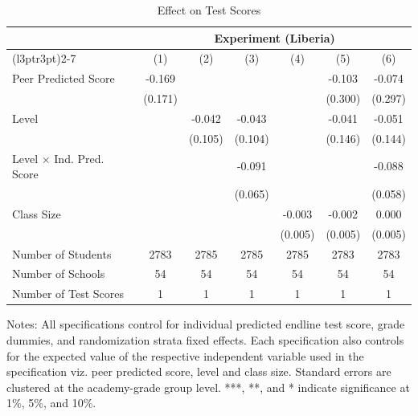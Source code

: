 \begin{table}[!h]
\centering\centering\centering
\caption{Effect on Test Scores}
\centering
\begin{threeparttable}
\fontsize{10}{12}\selectfont
\begin{tabular}[t]{lcccccc}
\toprule
\multicolumn{1}{c}{ } & \multicolumn{6}{c}{Experiment (Liberia)} \\
\cmidrule(l{3pt}r{3pt}){2-7}
  & (1) & (2) & (3) & (4) & (5) & (6)\\
\midrule
Peer Predicted Score & -0.169 &  &  &  & -0.103 & -0.074\\
 & (0.171) &  &  &  & (0.300) & (0.297)\\
Level &  & -0.042 & -0.043 &  & -0.041 & -0.051\\
 &  & (0.105) & (0.104) &  & (0.146) & (0.144)\\
Level $\times$ Ind. Pred. Score &  &  & -0.091 &  &  & -0.088\\
 &  &  & (0.065) &  &  & (0.058)\\
Class Size &  &  &  & -0.003 & -0.002 & 0.000\\
 &  &  &  & (0.005) & (0.005) & (0.005)\\
\hline
\midrule
Number of Students & 2783 & 2785 & 2785 & 2785 & 2783 & 2783\\
Number of Schools & 54 & 54 & 54 & 54 & 54 & 54\\
Number of Test Scores & 1 & 1 & 1 & 1 & 1 & 1\\
\bottomrule
\end{tabular}
\begin{tablenotes}[para]
\item Notes: All specifications control for individual predicted endline test score, 
           grade dummies, and randomization strata fixed effects. Each specification also controls for the    
           expected value of the respective independent variable used in the specification viz. peer predicted              score, level and class size. Standard errors are clustered at the academy-grade group level. ***, **,            and * indicate significance at 1\%, 5\%, and 10\%.
\end{tablenotes}
\end{threeparttable}
\end{table}
